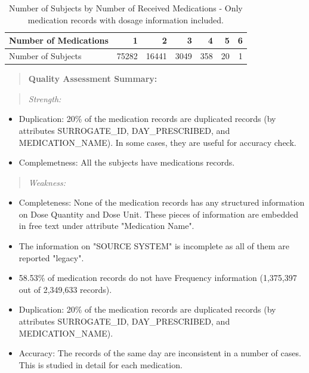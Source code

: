 \documentclass{article}
\begin{document}
\begin{table}[ht]
\centering
\begin{tabular}{lrrrrrr}
  \hline
Number of Medications & 1 & 2 & 3 & 4 & 5 & 6 \\ 
  \hline
Number of Subjects & 75282 & 16441 & 3049 & 358 &  20 &   1 \\ 
   \hline
\end{tabular}
\caption{Number of Subjects by Number of Received Medications - Only medication records with dosage information included.} 
\label{Table:1}
\end{table}
\newpage

\begin{quote}
\textbf{Quality Assessment Summary:}
\end{quote}
\begin{quote}
\emph{Strength:}
\end{quote}
\begin{itemize}
  \item Duplication: 20\% of the medication records are duplicated records (by attributes SURROGATE\_ID, DAY\_PRESCRIBED, and MEDICATION\_NAME). In some cases, they are useful for accuracy check. 
  \item Complemetness: All the subjects have medications records.
\end{itemize}
\begin{quote}
\emph{Weakness:}
\end{quote}
\begin{itemize}
  \item Completeness: None of the medication records has any structured information on Dose Quantity and Dose Unit. These pieces of information are embedded in free text under attribute "Medication Name".
  \item The information on "SOURCE SYSTEM" is incomplete as all of them are reported "legacy".
  \item 58.53\% of medication records do not have Frequency information (1,375,397 out of 2,349,633 records). 
  \item Duplication: 20\% of the medication records are duplicated records (by attributes SURROGATE\_ID, DAY\_PRESCRIBED, and MEDICATION\_NAME).
  \item Accuracy: The records of the same day are inconsistent in a number of cases. This is studied in detail for each medication.
\end{itemize}
\end{document}
